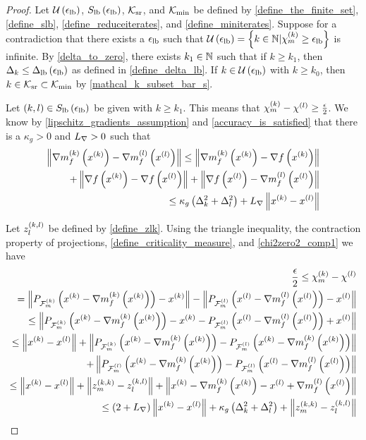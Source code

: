 \begin{proof}
Let $\ulb$, $\slb$, $\reduceiterates$, and $\miniterates$ be defined by 
\cref{define_the_finite_set}, \cref{define_slb}, \cref{define_reduceiterates}, and \cref{define_miniterates}.
Suppose for a contradiction that there exists a $\elb$ such that $\ulb = \left\{k \in \naturals | \chik \ge \elb \right\}$ is infinite.
By \cref{delta_to_zero}, there exists $k_1 \in \naturals$ such that if $k \ge k_1$, then $\dk \le \dlb$ as defined in \cref{define_delta_lb}.
If $k \in \ulb$ with $k \ge k_0$, then $k \in \reduceiterates \subset \miniterates$ by \cref{mathcal_k_subset_bar_s}.

Let $(k, l) \in \slb$ be given with $k \ge k_1$.
This means that $\chik - \chi^{(l)} \ge \frac {\epsilon} 2 $.
We know by \cref{lipschitz_gradients_assumption} and \cref{accuracy_is_satisfied} that there is a $\kappa_g > 0$ and $\lipgrad>0$ such that
\begin{align}
\left\|\gk - \gl\right\| \nonumber 
\le \left\|\gk - \gradf\left(\xk\right)\right\| \\
+ \left\|\gradf\left(\xk\right) - \gradf\left(\xl\right)\right\| 
+ \left\|\gradf\left(\xl\right) - \gl \right\| \nonumber \\
\le \kappa_g \left(\dk^2 + \dl^2\right) + \lipgrad \left\|\xk - \xl \right\| \label{chi2zero2_comp1}
\end{align}


Let $\zlk$ be defined by \cref{define_zlk}.
Using the triangle inequality, the contraction property of projections, 
\cref{define_criticality_measure}, and \cref{chi2zero2_comp1} we have 
\begin{align*}
\frac{\epsilon}{2} \le \chik - \chi^{(l)} \\
=     \left\|P_{\feasiblek}\left(\xk - \gk\right) - \xk\right \| 
    - \left\|P_{\feasiblel}\left(\xl - \gl\right) - \xl\right \| \\
\le   \left\|P_{\feasiblek}\left(\xk - \gk\right) - \xk
    -  P_{\feasiblel}\left(\xl - \gl\right) + \xl\right \| \\
 \le  \left\|\xk - \xl\right\|
 + \left\|P_{\feasiblek}\left(\xk - \gk\right) -  P_{\feasiblel}\left(\xk - \gk\right) \right\| \\
 + \left\|P_{\feasiblel}\left(\xk - \gk\right) -  P_{\feasiblel}\left(\xl - \gl\right) \right\| \\
\le \left\|\xk - \xl\right\| + \left\|\zmk - \zlk\right\| 
+ \left\| \xk - \gk - \xl + \gl  \right\| \\
\le \left(2 + \lipgrad\right) \left\|\xk - \xl\right\| 
+ \kappa_g \left(\dk^2 + \dl^2\right)
+ \left\|\zmk - \zlk\right\|
\end{align*}
        

\end{proof}

